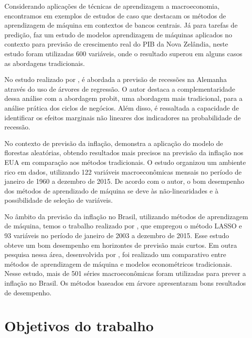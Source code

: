 Considerando aplicações de técnicas de aprendizagem a macroeconomia, encontramos em  exemplos de estudos de caso que destacam os métodos de aprendizagem de máquina em contextos de bancos centrais. Já para tarefas de predição,  faz um estudo de modelos aprendizagem de máquinas aplicados no contexto para previsão de crescimento real do PIB da Nova Zelândia, neste estudo foram utilizadas 600 variáveis, onde o resultado superou em alguns casos as abordagens tradicionais.   

No estudo realizado por , é abordada a previsão de recessões na Alemanha através do uso de árvores de regressão. O autor destaca a complementaridade dessa análise com a abordagem probit, uma abordagem mais tradicional, para a análise prática dos ciclos de negócios. Além disso, é ressaltada a capacidade de identificar os efeitos marginais não lineares dos indicadores na probabilidade de recessão.

No contexto de previsão da inflação,  demonstra a aplicação do modelo de florestas aleatórias, obtendo resultados mais precisos na previsão da inflação nos EUA em comparação aos métodos tradicionais. O estudo organizou um ambiente rico em dados, utilizando 122 variáveis macroeconômicas mensais no período de janeiro de 1960 a dezembro de 2015. De acordo com o autor, o bom desempenho dos métodos de aprendizado de máquina se deve às não-linearidades e à possibilidade de seleção de variáveis.

No âmbito da previsão da inflação no Brasil, utilizando métodos de aprendizagem de máquina, temos o trabalho realizado por , que empregou o método LASSO e 93 variáveis no período de janeiro de 2003 a dezembro de 2015. Esse estudo obteve um bom desempenho em horizontes de previsão mais curtos. Em outra pesquisa nessa área, desenvolvida por , foi realizado um comparativo entre métodos de aprendizagem de máquina e modelos econométricos tradicionais. Nesse estudo, mais de 501 séries macroeconômicas foram utilizadas para prever a inflação no Brasil. Os métodos baseados em árvore apresentaram bons resultados de desempenho.

\section{Objetivos do trabalho}\label{sec-objetivos}

